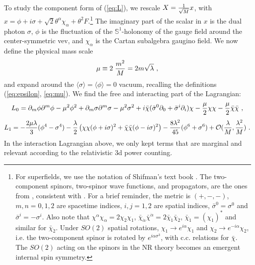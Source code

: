 \documentclass[11pt]{article}
\def\S{{\mathbb S}}
\begin{document}
To study the component form of (\ref{eq:L}), we rescale $X = {1\over \sqrt{ M}} x$, with $x = \phi + i \sigma + \sqrt{2} \theta^\alpha \chi_\alpha + \theta^2 F$.\footnote{\label{foot1}For superfields, we use the notation of  Shifman's text book \cite{Shifman:2012zz}. The  two-component spinors, two-spinor wave functions, and propagators, are the ones from \cite{Dreiner:2008tw}, consistent with \cite{Shifman:2012zz}. For a brief reminder, the metric is $(+,-,-)$, $m,n= 0,1,2$ are spacetime indices, $i,j=1,2$ are spatial indices, $\bar\sigma^{0} = \sigma^0$ and $\bar\sigma^{i} = - \sigma^i$. Also note that 
$\chi^\alpha \chi_\alpha = 2 \chi_2 \chi_1$, $\bar\chi_{\dot\alpha} \bar\chi^{\dot\alpha} = 2 \bar\chi_{\dot{1}} \bar\chi_{\dot{2}}$, $\bar\chi_{\dot{1}} = (\chi_1)^*$ and similar for $\bar\chi_{\dot{2}}$. Under $SO(2)$ spatial rotations,   $\chi_1 \rightarrow e^{i \alpha} \chi_1$ and $\chi_2 \rightarrow e^{-i \alpha} \chi_2$, i.e. the two-component spinor is rotated by $e^{i \alpha \sigma^3}$, with c.c. relations for $\bar\chi$. The $SO(2)$ acting on the spinors in the NR theory becomes an emergent  internal spin symmetry.  } 
The imaginary part of the scalar in $x$ is the dual photon $\sigma$,  $\phi$ is the fluctuation of the $\S^1$-holonomy of the gauge field    around the center-symmetric vev, and $\chi_\alpha$ is the Cartan subalgebra gaugino field.  
We now define  the physical mass scale
\begin{equation}
\label{eq:mu}
\mu \equiv 2 \;{   m^2 \over   M}= {2 m  }  \sqrt\lambda~ ,\end{equation}
 and expand around the  $\langle \sigma \rangle = \langle \phi \rangle = 0$ vacuum, recalling the definitions (\ref{eq:epsilon}, \ref{eq:mu}).  We find the free and interacting part of the Lagrangian:
\begin{equation}
\label{eq:L01}
L_0 =     \partial_m \phi\partial^m \phi -   \mu^2 \phi^2  + \partial_m \sigma\partial^m \sigma -   \mu^2 \sigma^2   + i \bar\chi (\bar\sigma^0 \partial_0 + \bar\sigma^i \partial_i) \chi - {\mu\over 2} \chi \chi - {\mu\over 2} \bar\chi\bar\chi~,
\end{equation}
 \begin{equation}\label{eq:L11}
L_1 =  -\frac{2\mu \lambda }{3} (\phi^4 - \sigma^4)  - { \lambda \over 2} \left(\chi\chi (\phi+i \sigma)^2 + \bar\chi \bar\chi(\phi- i \sigma)^2\right) -\frac{8\lambda^2}{45} ( \phi
   ^6 + \sigma^6) + {\cal{O}}({\lambda \over M}, {\lambda^2 \over M})~.       \end{equation}
In the interaction Lagrangian above, we only kept terms that are marginal and relevant according to the relativistic 3d power counting. 
\end{document}
